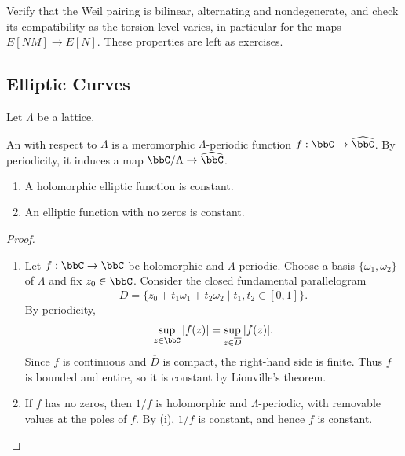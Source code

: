 \begin{remarkstar}
    Verify that the Weil pairing is bilinear, alternating and nondegenerate, and check its compatibility as the torsion level varies, in particular for the maps $E[NM] \to E[N]$. These properties are left as exercises.
\end{remarkstar}

\subsection{Elliptic Curves}\label{Sec:MF_elliptic_curves}
Let $\Lambda$ be a lattice.

\begin{definition}\label{Def:MF_elliptic_function}
    An  with respect to $\Lambda$ is a meromorphic $\Lambda$-periodic function $f : \bbC \to \widehat{\bbC}$. By periodicity, it induces a map $\bbC/\Lambda \to \widehat{\bbC}$.
\end{definition}

\begin{lemma}\label{Lem:MF_constant_elliptic_function}
    \leavevmode
    \begin{enumerate}[label=(\roman*)]
        \item A holomorphic elliptic function is constant.
        \item An elliptic function with no zeros is constant.
    \end{enumerate}
\end{lemma}

\begin{proof}
    \leavevmode
    \begin{enumerate}[label=(\roman*)]
        \item Let $f : \bbC \to \bbC$ be holomorphic and $\Lambda$-periodic. Choose a basis $\{\omega_1, \omega_2\}$ of $\Lambda$ and fix $z_0 \in \bbC$. Consider the closed fundamental parallelogram
        \[
            \overline D = \{z_0 + t_1\omega_1 + t_2\omega_2 \mid t_1, t_2 \in [0, 1]\}.
        \]
        By periodicity,
        \[
            \sup_{z \in \bbC}|f(z)| = \sup_{z \in \overline D}|f(z)|.
        \]
        Since $f$ is continuous and $\overline D$ is compact, the right-hand side is finite. Thus $f$ is bounded and entire, so it is constant by Liouville's theorem.

        \item If $f$ has no zeros, then $1/f$ is holomorphic and $\Lambda$-periodic, with removable values at the poles of $f$. By (i), $1/f$ is constant, and hence $f$ is constant.
    \end{enumerate}
\end{proof}

